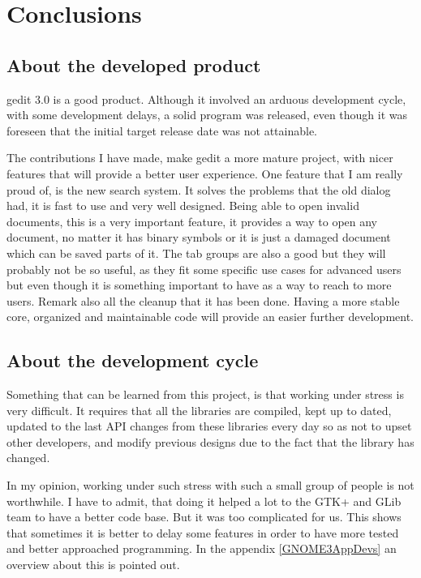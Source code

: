 \chapter{Conclusions}

\section{About the developed product}

gedit 3.0 is a good product. Although it involved an arduous development cycle, with some development delays, 
a solid program was released, even though it was foreseen that the  initial target release date was not attainable.

The contributions I have made, make gedit a more mature project, with nicer features that will provide a better user experience. One feature that I am really proud of, is the new search system. It solves the problems that the old dialog had, it is fast to use and very well designed. Being able to open invalid documents, this is a very important feature, it provides a way to open any document, no matter it has binary symbols or it is just a damaged document which can be saved parts of it. The tab groups are also a good but they will probably not be so useful, as they fit some specific use cases for advanced users but even though it is something important to have as a way to reach to more users. Remark also all the cleanup that it has been done. Having a more stable core, organized and maintainable code will provide an easier further development.

\section{About the development cycle}

Something that can be learned from this project, is that working under stress is very difficult. It requires that all the libraries are compiled, 
kept up to dated, updated to the last API changes from these libraries every day so as not to upset other developers, and 
modify previous designs due to the fact that the library has changed.

In my opinion, working under such stress with such a small group of people is not worthwhile.   I have to admit, that doing it helped a lot to the GTK+ and GLib team to have a better code base. But it was too complicated for us. This shows that sometimes it is better to delay some features in order to have more tested and better approached programming. In the appendix \ref{GNOME3AppDevs} an overview about this is pointed out.


